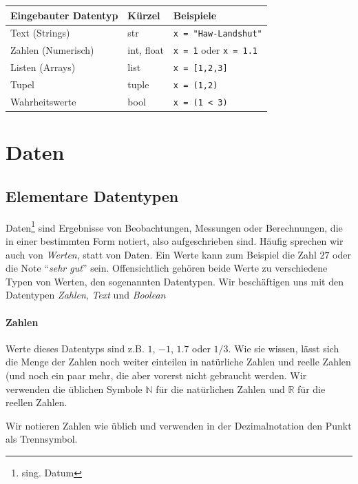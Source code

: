 \documentclass[
  oneside]{book}
\begin{document}
\begin{longtable}[]{@{}lll@{}}
\toprule
Eingebauter Datentyp & Kürzel & Beispiele \\
\midrule
\endhead
Text (Strings) & str & \texttt{x\ =\ "Haw-Landshut"} \\
Zahlen (Numerisch) & int, float & \texttt{x\ =\ 1} oder \texttt{x\ =\ 1.1} \\
Listen (Arrays) & list & \texttt{x\ =\ {[}1,2,3{]}} \\
Tupel & tuple & \texttt{x\ =\ (1,2)} \\
Wahrheitswerte & bool & \texttt{x\ =\ (1\ \textless{}\ 3)} \\
\bottomrule
\end{longtable}

\hypertarget{daten}{%
\chapter{Daten}\label{daten}}

\hypertarget{elementare-datentypen}{%
\section{Elementare Datentypen}\label{elementare-datentypen}}

Daten\footnote{sing. Datum} sind Ergebnisse von Beobachtungen, Messungen oder Berechnungen, die in einer bestimmten Form notiert, also aufgeschrieben sind. Häufig sprechen wir auch von \emph{Werten}, statt von Daten. Ein Werte kann zum Beispiel die Zahl \(27\) oder die Note ``\emph{sehr gut}'' sein. Offensichtlich gehören beide Werte zu verschiedene Typen von Werten, den sogenannten Datentypen. Wir beschäftigen uns mit den Datentypen \emph{Zahlen}, \emph{Text} und \emph{Boolean}

\hypertarget{zahlen}{%
\subsubsection*{Zahlen}\label{zahlen}}

Werte dieses Datentyps sind z.B. \(1\), \(-1\), \(1.7\) oder \(1/3\). Wie sie wissen, lässt sich die Menge der Zahlen noch weiter einteilen in natürliche Zahlen und reelle Zahlen (und noch ein paar mehr, die aber vorerst nicht gebraucht werden. Wir verwenden die üblichen Symbole \(\mathbb{N}\) für die natürlichen Zahlen und \(\mathbb{R}\) für die reellen Zahlen.

Wir notieren Zahlen wie üblich und verwenden in der Dezimalnotation den Punkt als Trennsymbol.
\end{document}
